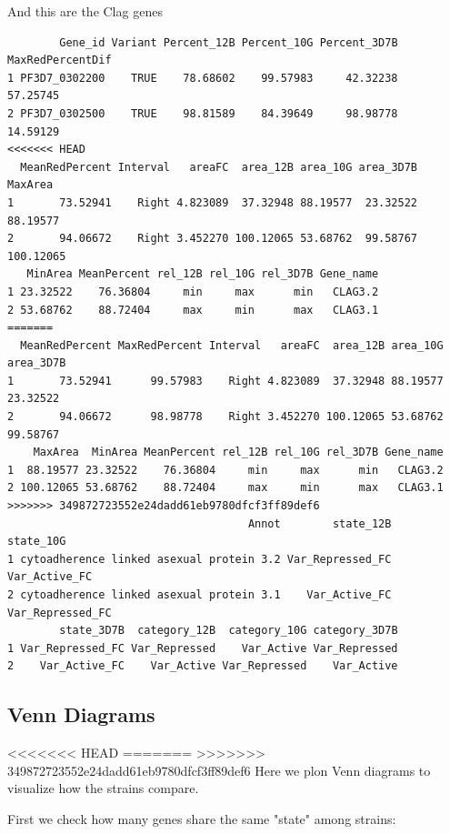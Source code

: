\documentclass[11pt]{article}
\begin{document}
And this are the Clag genes
\begin{verbatim}
        Gene_id Variant Percent_12B Percent_10G Percent_3D7B MaxRedPercentDif
1 PF3D7_0302200    TRUE    78.68602    99.57983     42.32238         57.25745
2 PF3D7_0302500    TRUE    98.81589    84.39649     98.98778         14.59129
<<<<<<< HEAD
  MeanRedPercent Interval   areaFC  area_12B area_10G area_3D7B   MaxArea
1       73.52941    Right 4.823089  37.32948 88.19577  23.32522  88.19577
2       94.06672    Right 3.452270 100.12065 53.68762  99.58767 100.12065
   MinArea MeanPercent rel_12B rel_10G rel_3D7B Gene_name
1 23.32522    76.36804     min     max      min   CLAG3.2
2 53.68762    88.72404     max     min      max   CLAG3.1
=======
  MeanRedPercent MaxRedPercent Interval   areaFC  area_12B area_10G area_3D7B
1       73.52941      99.57983    Right 4.823089  37.32948 88.19577  23.32522
2       94.06672      98.98778    Right 3.452270 100.12065 53.68762  99.58767
    MaxArea  MinArea MeanPercent rel_12B rel_10G rel_3D7B Gene_name
1  88.19577 23.32522    76.36804     min     max      min   CLAG3.2
2 100.12065 53.68762    88.72404     max     min      max   CLAG3.1
>>>>>>> 349872723552e24dadd61eb9780dfcf3ff89def6
                                     Annot        state_12B        state_10G
1 cytoadherence linked asexual protein 3.2 Var_Repressed_FC    Var_Active_FC
2 cytoadherence linked asexual protein 3.1    Var_Active_FC Var_Repressed_FC
        state_3D7B  category_12B  category_10G category_3D7B
1 Var_Repressed_FC Var_Repressed    Var_Active Var_Repressed
2    Var_Active_FC    Var_Active Var_Repressed    Var_Active
\end{verbatim}

\subsection{Venn Diagrams}
<<<<<<< HEAD
\label{sec:org02cbd66}
=======
\label{sec:orgde82d5d}
>>>>>>> 349872723552e24dadd61eb9780dfcf3ff89def6
Here we plon Venn diagrams to visualize how the strains compare.

First we check how many genes share the same "state" among strains:
\end{document}
